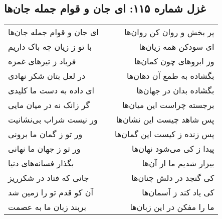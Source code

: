 \begin{center}
\section*{غزل شماره ۱۱۵: ای جان و قوام جمله جان‌ها}
\label{sec:0115}
\begin{longtable}{l p{0.5cm} r}
ای جان و قوام جمله جان‌ها
&&
پر بخش و روان کن روان‌ها
\\
با تو ز زیان چه باک داریم
&&
ای سودکن همه زیان‌ها
\\
فریاد ز تیرهای غمزه
&&
وز ابروهای چون کمان‌ها
\\
در لعل بتان شکر نهادی
&&
بگشاده به طمع آن دهان‌ها
\\
ای داده به دست ما کلیدی
&&
بگشاده بدان در جهان‌ها
\\
گر زانک نه در میان مایی
&&
برجسته چراست این میان‌ها
\\
ور نیست شراب بی‌نشانیت
&&
پس شاهد چیست این نشان‌ها
\\
ور تو ز گمان ما برونی
&&
پس زنده ز کیست این گمان‌ها
\\
ور تو ز جهان ما نهانی
&&
پیدا ز کی می‌شود نهان‌ها
\\
بگذار فسانه‌های دنیا
&&
بیزار شدیم ما از آن‌ها
\\
جانی که فتاد در شکرریز
&&
کی گنجد در دلش چنان‌ها
\\
آن کو قدم تو را زمین شد
&&
کی یاد کند ز آسمان‌ها
\\
بربند زبان ما به عصمت
&&
ما را مفکن در این زبان‌ها
\\
\end{longtable}
\end{center}
